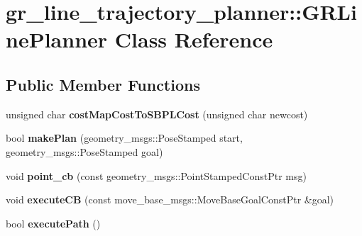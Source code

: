 \hypertarget{classgr__line__trajectory__planner_1_1GRLinePlanner}{}\section{gr\+\_\+line\+\_\+trajectory\+\_\+planner\+:\+:G\+R\+Line\+Planner Class Reference}
\label{classgr__line__trajectory__planner_1_1GRLinePlanner}
\subsection*{Public Member Functions}
\begin{DoxyCompactItemize}
\item 
\mbox{\label{classgr__line__trajectory__planner_1_1GRLinePlanner_a88d48d486912cd2111a37cd9ee8e6b41}} 
unsigned char {\bfseries cost\+Map\+Cost\+To\+S\+B\+P\+L\+Cost} (unsigned char newcost)
\item 
\mbox{\label{classgr__line__trajectory__planner_1_1GRLinePlanner_a3926e3c5d09fc3e305cbb0d0482d6849}} 
bool {\bfseries make\+Plan} (geometry\+\_\+msgs\+::\+Pose\+Stamped start, geometry\+\_\+msgs\+::\+Pose\+Stamped goal)
\item 
\mbox{\label{classgr__line__trajectory__planner_1_1GRLinePlanner_a63d08d3230618e2a9ebafbec6adc2902}} 
void {\bfseries point\+\_\+cb} (const geometry\+\_\+msgs\+::\+Point\+Stamped\+Const\+Ptr msg)
\item 
\mbox{\label{classgr__line__trajectory__planner_1_1GRLinePlanner_ae858beef29eabea796e9e04817a73a77}} 
void {\bfseries execute\+CB} (const move\+\_\+base\+\_\+msgs\+::\+Move\+Base\+Goal\+Const\+Ptr \&goal)
\item 
\mbox{\label{classgr__line__trajectory__planner_1_1GRLinePlanner_aca31ac592682f8711bfb1e62d3bdcd6e}} 
bool {\bfseries execute\+Path} ()
\item 
\mbox{\label{classgr__line__trajectory__planner_1_1GRLinePlanner_aba069d975df5aef6cb14a287fd9597eb}} 

\end{DoxyCompactItemize}
